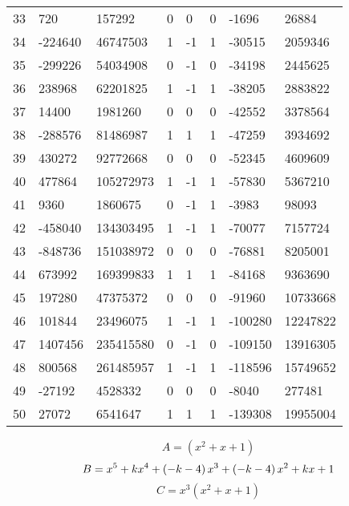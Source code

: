 \documentclass{amsart}
\begin{document}
\begin{longtable}{|l|l|l|lllll|}
33&720&157292&0&0&0&-1696&26884\\
34&-224640&46747503&1&-1&1&-30515&2059346\\
35&-299226&54034908&0&-1&0&-34198&2445625\\
36&238968&62201825&1&-1&1&-38205&2883822\\
37&14400&1981260&0&0&0&-42552&3378564\\
38&-288576&81486987&1&1&1&-47259&3934692\\
39&430272&92772668&0&0&0&-52345&4609609\\
40&477864&105272973&1&-1&1&-57830&5367210\\
41&9360&1860675&0&-1&1&-3983&98093\\
42&-458040&134303495&1&-1&1&-70077&7157724\\
43&-848736&151038972&0&0&0&-76881&8205001\\
44&673992&169399833&1&1&1&-84168&9363690\\
45&197280&47375372&0&0&0&-91960&10733668\\
46&101844&23496075&1&-1&1&-100280&12247822\\
47&1407456&235415580&0&-1&0&-109150&13916305\\
48&800568&261485957&1&-1&1&-118596&15749652\\
49&-27192&4528332&0&0&0&-8040&277481\\
50&27072&6541647&1&1&1&-139308&19955004\\
\hline
\end{longtable}
$$A=(x^2
 + x
 + 1)$$
$$B=x^5
 + k\*x^4
 + \left(-k
 - 4\right) \*x^3
 + \left(-k
 - 4\right) \*x^2
 + k\*x
 + 1$$
$$C=x^3(x^2
 + x
 + 1)$$
\end{document}
